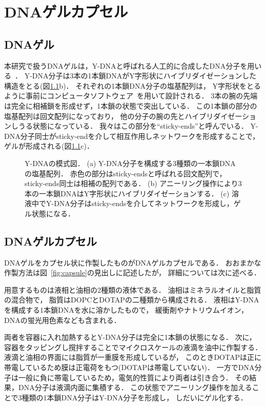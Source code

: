 \chapter{DNAゲルカプセル}

\section{DNAゲル}

本研究で扱うDNAゲルは，Y-DNAと呼ばれる人工的に合成したDNA分子を用いる~\cite{sato2019sequence}．
Y-DNA分子は3本の1本鎖DNAがY字形状にハイブリダイゼーションした構造をとる(図\ref{fig:ydna}b)．
それぞれの1本鎖DNA分子の塩基配列は，
Y字形状をとるように事前にコンピュータソフトウェア~\cite{zadeh2011nupack}を用いて設計される．
3本の腕の先端は完全に相補鎖を形成せず，1本鎖の状態で突出している．
この1本鎖の部分の塩基配列は回文配列になっており，
他の分子の腕の先とハイブリダイゼーションしうる状態になっている．
我々はこの部分を``sticky-ends''と呼んでいる．
Y-DNA分子同士がsticky-endを介して相互作用しネットワークを形成することで，ゲルが形成される(図\ref{fig:ydna}c)．

\begin{figure}
\centering

\caption{Y-DNAの模式図．
    (a) Y-DNA分子を構成する3種類の一本鎖DNAの塩基配列．
        赤色の部分はsticky-endsと呼ばれる回文配列で，sticky-ends同士は相補の配列である．
    (b) アニーリング操作により3本の一本鎖DNAはY字形状にハイブリダイゼーションする．
    (c) 溶液中でY-DNA分子はsticky-endsを介してネットワークを形成し，ゲル状態になる．
}

\label{fig:ydna}
\end{figure}

\section{DNAゲルカプセル}

DNAゲルをカプセル状に作製したものがDNAゲルカプセルである．
おおまかな作製方法は図~\ref{fig:capsule}の見出しに記述したが，
詳細については次に述べる．

用意するものは液相と油相の2種類の液体である．
油相はミネラルオイルと脂質の混合物で，
脂質はDOPCとDOTAPの二種類から構成される．
液相はY-DNAを構成する1本鎖DNAを水に溶かしたもので，
緩衝剤やナトリウムイオン，DNAの蛍光用色素なども含まれる．

両者を容器に入れ加熱するとY-DNA分子は完全に1本鎖の状態になる．
次に，容器をタッピングし撹拌することでマイクロスケールの液滴を油中に作製する．
液滴と油相の界面には脂質が一重膜を形成しているが，
このときDOTAPは正に帯電しているため膜は正電荷をもつ(DOTAPは帯電していない)．
一方でDNA分子は一般に負に帯電しているため，電気的性質により両者は引き合う．
その結果，DNA分子は液滴内面に集積する．
この状態でアニーリング操作を加えることで3種類の1本鎖DNA分子はY-DNA分子を形成し，
しだいにゲル化する．

